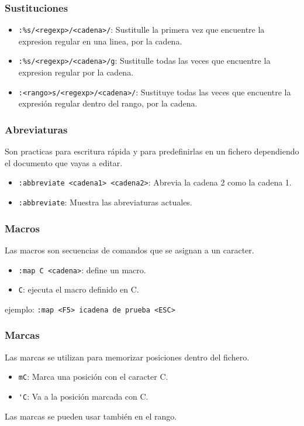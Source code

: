 \documentclass[10pt]{beamer}
\begin{document}
  \begin{frame}[containsverbatim]
    \frametitle{Sustituciones}
    \begin{itemize}
      \item \verb+:%s/<regexp>/<cadena>/+: Sustitulle la primera vez que encuentre la expresion regular en una linea, por la cadena.
      \item \verb+:%s/<regexp>/<cadena>/g+: Sustitulle todas las veces que encuentre la expresion regular por la cadena.
      \item \verb+:<rango>s/<regexp>/<cadena>/+: Sustituye todas las veces que encuentre la expresión regular dentro del rango, por la cadena.
    \end{itemize}
  \end{frame}
  
  \begin{frame}[containsverbatim]
    \frametitle{Abreviaturas}
    Son practicas para escritura rápida y para predefinirlas en un fichero dependiendo el documento que vayas a editar.
    \begin{itemize}
      \item \verb+:abbreviate <cadena1> <cadena2>+: Abrevia la cadena 2 como la cadena 1.
      \item \verb+:abbreviate+: Muestra las abreviaturas actuales.
    \end{itemize}
  \end{frame}
  
  \begin{frame}[containsverbatim]
    \frametitle{Macros}
    Las macros son secuencias de comandos que se asignan a un caracter.
    \begin{itemize}
      \item \verb+:map C <cadena>+: define un macro.
      \item \verb+C+: ejecuta el macro definido en C.
    \end{itemize}
    ejemplo: \verb+:map <F5> icadena de prueba <ESC>+
  \end{frame}
  
  \begin{frame}[containsverbatim]
    \frametitle{Marcas}
    Las marcas se utilizan para memorizar posiciones dentro del fichero.
    \begin{itemize}
      \item \verb+mC+: Marca una posición con el caracter C.
      \item \verb+'C+: Va a la posición marcada con C.
    \end{itemize}
    Las marcas se pueden usar también en el rango.
  \end{frame}
  
\end{document}
